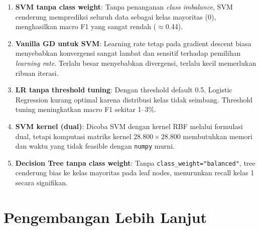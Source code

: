 \documentclass[12pt,a4paper]{article}
\begin{document}
\begin{enumerate}
    \item \textbf{SVM tanpa class weight}: Tanpa penanganan \textit{class imbalance}, SVM cenderung memprediksi seluruh data sebagai kelas mayoritas (0), menghasilkan macro F1 yang sangat rendah ($\approx$0.44).

    \item \textbf{Vanilla GD untuk SVM}: Learning rate tetap pada gradient descent biasa menyebabkan konvergensi sangat lambat dan sensitif terhadap pemilihan \textit{learning rate}. Terlalu besar menyebabkan divergensi, terlalu kecil memerlukan ribuan iterasi.

    \item \textbf{LR tanpa threshold tuning}: Dengan threshold default 0.5, Logistic Regression kurang optimal karena distribusi kelas tidak seimbang. Threshold tuning meningkatkan macro F1 sekitar 1--3\%.

    \item \textbf{SVM kernel (dual)}: Dicoba SVM dengan kernel RBF melalui formulasi dual, tetapi komputasi matriks kernel $28.800 \times 28.800$ membutuhkan memori dan waktu yang tidak feasible dengan \texttt{numpy} murni.

    \item \textbf{Decision Tree tanpa class weight}: Tanpa \texttt{class\_weight="balanced"}, tree cenderung bias ke kelas mayoritas pada leaf nodes, menurunkan recall kelas 1 secara signifikan.
\end{enumerate}

\section{Pengembangan Lebih Lanjut}
\label{sec:future}
\end{document}
